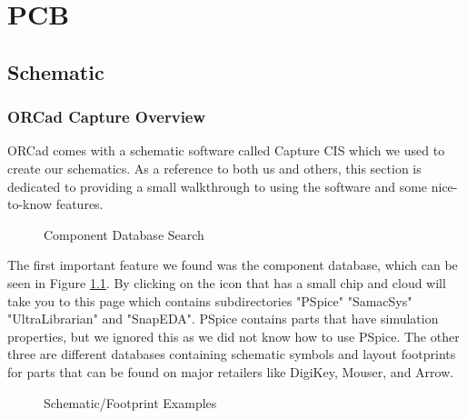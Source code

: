 \chapter{PCB
\label{PCB}}
\section{Schematic}
\subsection{ORCad Capture Overview}
ORCad comes with a schematic software called Capture CIS which we used to create our schematics. As a reference to both us and others, this section is
dedicated to providing a small walkthrough to using the software and some nice-to-know features.
\begin{figure}[H]
\caption{Component Database Search}
\label{img:ultralib}
\end{figure}

The first important feature we found was the component database, which can be seen in Figure \ref{img:ultralib}. By clicking on the icon that has a small chip and cloud will 
take you to this page which contains subdirectories "PSpice" "SamacSys" "UltraLibrarian" and "SnapEDA". PSpice contains parts that
have simulation properties, but we ignored this as we did not know how to use PSpice. The other three are different databases
containing schematic symbols and layout footprints for parts that can be found on major retailers like DigiKey, Mouser, and Arrow.

\begin{figure}[H]
\caption{Schematic/Footprint Examples}
\label{img:ultralibexample}
\end{figure}

